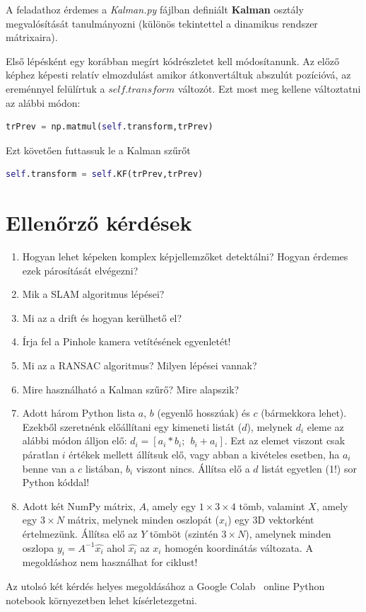 \documentclass[12pt,a4paper,oneside]{report}             %
\begin{document}
A feladathoz érdemes a \emph{Kalman.py} fájlban definiált \textbf{Kalman} osztály megvalósítását tanulmányozni (különös tekintettel a dinamikus rendszer mátrixaira).

Első lépésként egy korábban megírt kódrészletet kell módosítanunk. Az előző képhez képesti relatív elmozdulást amikor átkonvertáltuk abszulút pozícióvá, az ereménnyel felülírtuk a $self.transform$ változót. Ezt most meg kellene változtatni az alábbi módon:

\begin{lstlisting}[language=Python]
trPrev = np.matmul(self.transform,trPrev)
\end{lstlisting}

Ezt követően futtassuk le a Kalman szűrőt

\begin{lstlisting}[language=Python]
self.transform = self.KF(trPrev,trPrev)
\end{lstlisting}

\chapter{Ellenőrző kérdések}

\begin{enumerate}
	\item Hogyan lehet képeken komplex képjellemzőket detektálni? Hogyan érdemes ezek párosítását elvégezni?
	\item Mik a SLAM algoritmus lépései?
	\item Mi az a drift és hogyan kerülhető el?
	\item Írja fel a Pinhole kamera vetítésének egyenletét!
	\item Mi az a RANSAC algoritmus? Milyen lépései vannak?
	\item Mire használható a Kalman szűrő? Mire alapszik?
	\item Adott három Python lista $a$, $b$ (egyenlő hosszúak) és $c$ (bármekkora lehet). Ezekből szeretnénk előállítani egy kimeneti listát ($d$), melynek $d_i$ eleme az alábbi módon álljon elő: $d_i = [a_i*b_i; ~~ b_i+a_i]$. Ezt az elemet viszont csak páratlan $i$ értékek mellett állítsuk elő, vagy abban a kivételes esetben, ha $a_i$ benne van a $c$ listában, $b_i$ viszont nincs. Állítsa elő a $d$ listát egyetlen (1!) sor Python kóddal!
	\item Adott két NumPy mátrix, $A$, amely egy $1\times 3\times 4$ tömb, valamint $X$, amely egy $3\times N$ mátrix, melynek minden oszlopát ($x_i$) egy 3D vektorként értelmezünk. Állítsa elő az $Y$ tömböt (szintén $3\times N$), amelynek minden oszlopa $y_i = A^{-1} \hat{x_i}$ ahol $\hat{x_i}$ az $x_i$ homogén koordinátás változata. A megoldáshoz nem használhat for ciklust!
\end{enumerate}

Az utolsó két kérdés helyes megoldásához a Google Colab~\cite{colab} online Python notebook környezetben lehet kísérletezgetni.

\printbibliography
\end{document}
